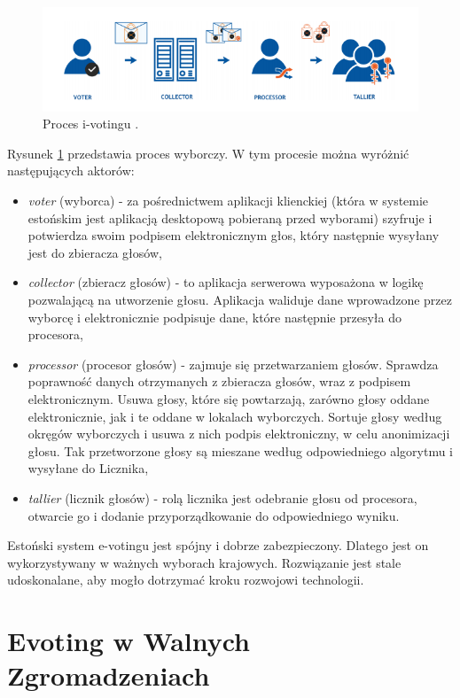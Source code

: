 \documentclass[a4paper,12pt]{book}
\begin{document}
\begin{figure}[H]
	\centering
	\includegraphics[width=\textwidth]{images/Główne częsci systemu estońskiego.png}
	\caption{Proces i-votingu \cite{estonian:voting}.}\label{estprocess}
\end {figure}

Rysunek \ref{estprocess} przedstawia proces wyborczy. W tym procesie można wyróżnić następujących aktorów:
\begin{itemize}
\item \textit{voter} (wyborca) - za pośrednictwem aplikacji klienckiej (która w systemie estońskim jest aplikacją desktopową pobieraną przed wyborami) szyfruje i~ potwierdza swoim podpisem elektronicznym głos, który następnie wysyłany jest do zbieracza głosów,
\item \textit{collector} (zbieracz głosów) - to aplikacja serwerowa wyposażona w logikę pozwalającą na utworzenie głosu. Aplikacja waliduje dane wprowadzone przez wyborcę i elektronicznie podpisuje dane, które następnie przesyła do procesora,
\item \textit{processor} (procesor głosów) - zajmuje się przetwarzaniem głosów. Sprawdza poprawność danych otrzymanych z zbieracza głosów, wraz z podpisem elektronicznym. Usuwa głosy, które się powtarzają, zarówno głosy oddane elektronicznie, jak i te oddane w lokalach wyborczych. Sortuje głosy według okręgów wyborczych i usuwa z nich podpis elektroniczny, w celu anonimizacji głosu. Tak przetworzone głosy są mieszane według odpowiedniego algorytmu i wysyłane do Licznika,
\item \textit{tallier} (licznik głosów) - rolą licznika jest odebranie głosu od procesora, otwarcie go i dodanie przyporządkowanie do odpowiedniego wyniku.
\end{itemize}

Estoński system e-votingu jest spójny i dobrze zabezpieczony. Dlatego jest on wykorzystywany w ważnych wyborach krajowych. Rozwiązanie jest stale udoskonalane, aby mogło dotrzymać kroku rozwojowi technologii.\cite{estonian:voting}

\section{Evoting w Walnych Zgromadzeniach}
\end{document}
